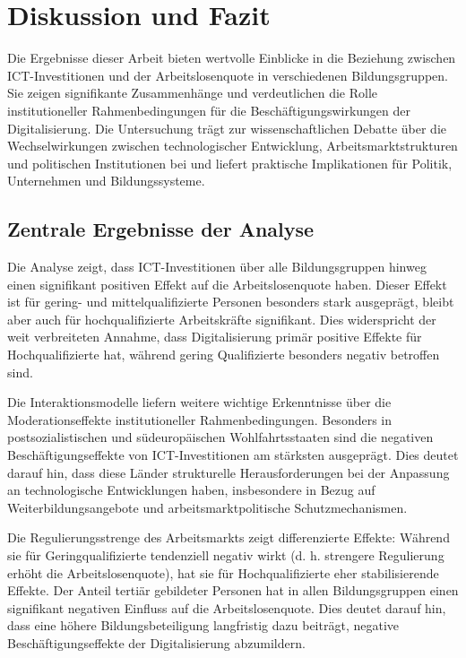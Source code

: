 
\section{Diskussion und Fazit}

Die Ergebnisse dieser Arbeit bieten wertvolle Einblicke in die Beziehung zwischen 
\ac{ICT}-Investitionen und der Arbeitslosenquote in verschiedenen Bildungsgruppen. Sie 
zeigen signifikante Zusammenhänge und verdeutlichen die Rolle institutioneller 
Rahmenbedingungen für die Beschäftigungswirkungen der Digitalisierung. Die Untersuchung 
trägt zur wissenschaftlichen Debatte über die Wechselwirkungen zwischen technologischer 
Entwicklung, Arbeitsmarktstrukturen und politischen Institutionen bei und liefert 
praktische Implikationen für Politik, Unternehmen und Bildungssysteme.

\subsection{Zentrale Ergebnisse der Analyse}

Die Analyse zeigt, dass \ac{ICT}-Investitionen über alle Bildungsgruppen hinweg einen 
signifikant positiven Effekt auf die Arbeitslosenquote haben. Dieser Effekt ist für 
gering- und mittelqualifizierte Personen besonders stark ausgeprägt, bleibt aber auch für 
hochqualifizierte Arbeitskräfte signifikant. Dies widerspricht der weit verbreiteten 
Annahme, dass Digitalisierung primär positive Effekte für Hochqualifizierte hat, während 
gering Qualifizierte besonders negativ betroffen sind.

Die Interaktionsmodelle liefern weitere wichtige Erkenntnisse über die Moderationseffekte 
institutioneller Rahmenbedingungen. Besonders in postsozialistischen und südeuropäischen 
Wohlfahrtsstaaten sind die negativen Beschäftigungseffekte von \ac{ICT}-Investitionen am 
stärksten ausgeprägt. Dies deutet darauf hin, dass diese Länder strukturelle Herausforderungen 
bei der Anpassung an technologische Entwicklungen haben, insbesondere in Bezug auf 
Weiterbildungsangebote und arbeitsmarktpolitische Schutzmechanismen.

Die Regulierungsstrenge des Arbeitsmarkts zeigt differenzierte Effekte: Während sie für 
Geringqualifizierte tendenziell negativ wirkt (d. h. strengere Regulierung erhöht die 
Arbeitslosenquote), hat sie für Hochqualifizierte eher stabilisierende Effekte. Der 
Anteil tertiär gebildeter Personen hat in allen Bildungsgruppen einen signifikant 
negativen Einfluss auf die Arbeitslosenquote. Dies deutet darauf hin, dass eine höhere 
Bildungsbeteiligung langfristig dazu beiträgt, negative Beschäftigungseffekte der Digitalisierung 
abzumildern.

